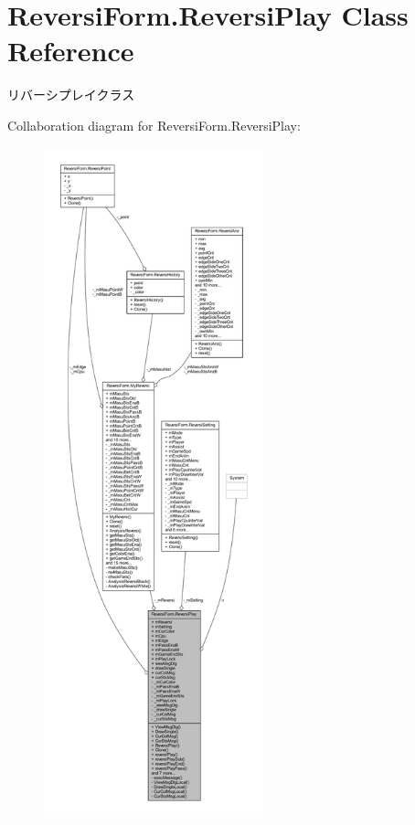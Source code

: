 \hypertarget{class_reversi_form_1_1_reversi_play}{}\section{Reversi\+Form.\+Reversi\+Play Class Reference}
\label{class_reversi_form_1_1_reversi_play}


リバーシプレイクラス  




Collaboration diagram for Reversi\+Form.\+Reversi\+Play\+:
\nopagebreak
\begin{figure}[H]
\begin{center}
\leavevmode
\includegraphics[height=550pt]{class_reversi_form_1_1_reversi_play__coll__graph}
\end{center}
\end{figure}
